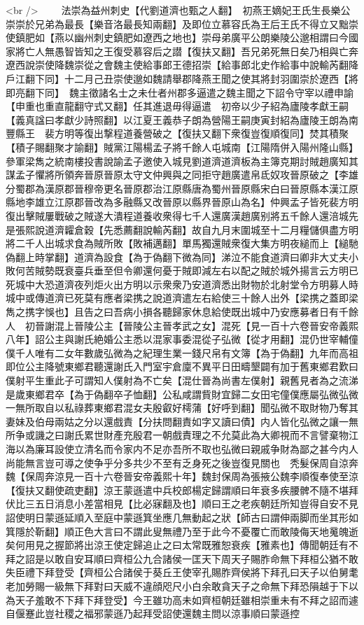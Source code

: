 <br />
　　法崇為益州刺史【代劉道濟也甄之人翻】　初燕王嫡妃王氏生長樂公崇崇於兄弟為最長【樂音洛最長知兩翻】及即位立慕容氏為王后王氏不得立又黜崇使鎮肥如【燕以幽州刺史鎮肥如遼西之地也】崇母弟廣平公朗樂陵公邈相謂曰今國家將亡人無愚智皆知之王復受慕容后之譛【復扶又翻】吾兄弟死無日矣乃相與亡奔遼西說崇使降魏崇從之會魏主使給事郎王德招崇【給事郎北史作給事中說輸芮翻降戶江翻下同】十二月己丑崇使邈如魏請舉郡降燕王聞之使其將封羽圍崇於遼西【將即亮翻下同】　魏主徵諸名士之未仕者州郡多逼遣之魏主聞之下詔令守宰以禮申諭【申重也重直龍翻守式又翻】任其進退毋得逼遣　初帝以少子紹為廬陵孝獻王嗣【義真諡曰孝獻少詩照翻】以江夏王義恭子朗為營陽王嗣庚寅封紹為廬陵王朗為南豐縣王　裴方明等復出撃程道養營破之【復扶又翻下衆復豈復順復同】焚其積聚【積子賜翻聚才諭翻】賊黨江陽楊孟子將千餘人屯城南【江陽隋併入陽州隆山縣】參軍梁雋之統南樓投書說諭孟子邀使入城見劉道濟道濟板為主簿克期討賊趙廣知其謀孟子懼將所領奔晉原晉原太守文仲興與之同拒守趙廣遣帛氐奴攻晉原破之【李雄分蜀郡為漢原郡晉穆帝更名晉原郡治江原縣唐為蜀州晉原縣宋白曰晉原縣本漢江原縣地李雄立江原郡晉改為多融縣又改晉原以縣界晉原山為名】仲興孟子皆死裴方明復出擊賊屢戰破之賊遂大潰程道養收衆得七千人還廣漢趙廣别將五千餘人還涪城先是張熙說道濟糶倉穀【先悉薦翻說輸芮翻】故自九月末圍城至十二月糧儲俱盡方明將二千人出城求食為賊所敗【敗補邁翻】單馬獨還賊衆復大集方明夜縋而上【縋馳偽翻上時掌翻】道濟為設食【為于偽翻下微為同】涕泣不能食道濟曰卿非大丈夫小敗何苦賊勢既衰臺兵垂至但令卿還何憂于賊即減左右以配之賊於城外揚言云方明已死城中大恐道濟夜列炬火出方明以示衆衆乃安道濟悉出財物於北射堂令方明募人時城中或傳道濟已死莫有應者梁携之說道濟遣左右給使三十餘人出外【梁携之蓋即梁雋之携字悞也】且告之曰吾病小損各聽歸家休息給使既出城中乃安應募者日有千餘人　初晉謝混上晉陵公主【晉陵公主晉孝武之女】混死【見一百十六卷晉安帝義熙八年】詔公主與謝氏絶婚公主悉以混家事委混從子弘微【從才用翻】混仍世宰輔僮僕千人唯有二女年數歲弘微為之紀理生業一錢尺帛有文簿【為于偽翻】九年而高祖即位公主降號東鄉君聽還謝氏入門室宇倉廩不異平日田疇墾闢有加于舊東鄉君歎曰僕射平生重此子可謂知人僕射為不亡矣【混仕晉為尚書左僕射】親舊見者為之流涕是歲東鄉君卒【為于偽翻卒子恤翻】公私咸謂貲財宜歸二女田宅僮僕應屬弘微弘微一無所取自以私祿葬東鄉君混女夫殷叡好樗蒲【好呼到翻】聞弘微不取財物乃奪其妻妹及伯母兩姑之分以還戲責【分扶問翻責如字又讀曰債】内人皆化弘微之讓一無所争或譏之曰謝氏累世財產充殷君一朝戲責理之不允莫此為大卿視而不言譬棄物江海以為廉耳設使立清名而令家内不足亦吾所不取也弘微曰親戚争財為鄙之甚今内人尚能無言豈可導之使争乎分多共少不至有乏身死之後豈復見關也　秃髮保周自涼奔魏【保周奔涼見一百十六卷晉安帝義熙十年】魏封保周為張掖公魏李順復奉使至涼【復扶又翻使疏吏翻】涼王蒙遜遣中兵校郎楊定歸謂順曰年衰多疾腰髀不隨不堪拜伏比三五日消息小差當相見【比必寐翻及也】順曰王之老疾朝廷所知豈得自安不見詔使明日蒙遜延順入至庭中蒙遜箕坐應几無動起之狀【師古曰謂伸兩脚而坐其形如箕隱於靳翻】順正色大言曰不謂此叟無禮乃至于此今不憂覆亡而敢陵侮天地䰟魄逝矣何用見之握節將出涼王使定歸追止之曰太常既雅恕衰疾【雅素也】傳聞朝廷有不拜之詔是以敢自安耳順曰齊桓公九合諸侯一匡天下周天子賜胙命無下拜桓公猶不敢失臣禮下拜登受【齊桓公合諸侯于葵丘王使宰孔賜胙齊侯將下拜孔曰天子以伯舅耄老加勞賜一級無下拜對曰天威不違顔咫尺小白余敢貪天子之命無下拜恐隕越于下以為天子羞敢不下拜下拜登受】今王雖功高未如齊桓朝廷雖相崇重未有不拜之詔而遽自偃蹇此豈社稷之福邪蒙遜乃起拜受詔使還魏主問以涼事順曰蒙遜控